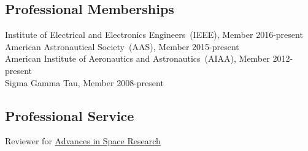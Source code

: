 \subsection*{Professional Memberships}

Institute of Electrical and Electronics Engineers~(IEEE), Member \hfill {2016-present} \\
American Astronautical Society~(AAS), Member \hfill {2015-present} \\
American Institute of Aeronautics and Astronautics~(AIAA), Member \hfill {2012-present} \\
Sigma Gamma Tau, Member \hfill  {2008-present} \\

\subsection*{Professional Service}
Reviewer for \href{http://www.journals.elsevier.com/advances-in-space-research/}{Advances in Space Research}
